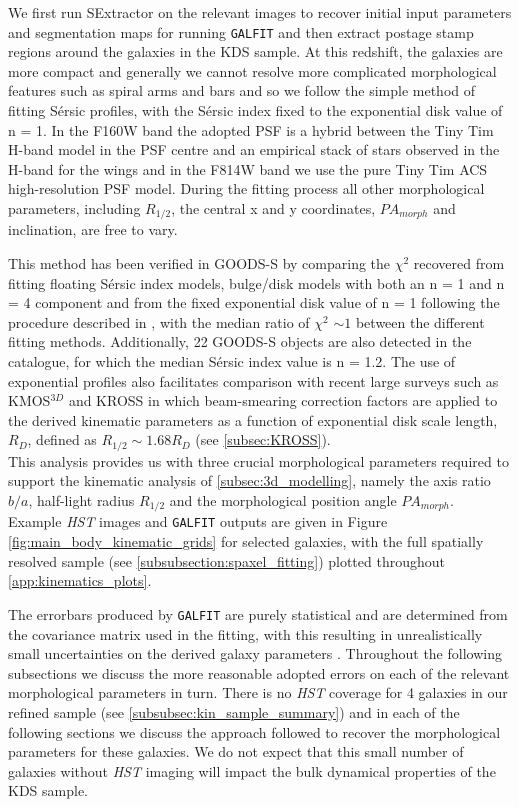 \documentclass[fleqn,usenatbib]{mn2e}
\newcommand{\Sers}{S\'{e}rsic }
\begin{document}
We first run SExtractor \citep{Bertin1996} on the relevant images to recover initial input parameters and segmentation maps for running {\tt GALFIT} and then extract postage stamp regions around the galaxies in the KDS sample.
At this redshift, the galaxies are more compact and generally we cannot resolve more complicated morphological features such as spiral arms and bars and so we follow the simple method of fitting \Sers profiles, with the \Sers index fixed to the exponential disk value of n = 1.
In the F160W band the adopted PSF is a hybrid between the Tiny Tim H-band model \citep{Krist2011} in the PSF centre and an empirical stack of stars observed in the H-band for the wings \citep{VanderWel2012} and in the F814W band we use the pure Tiny Tim ACS high-resolution PSF model.
During the fitting process all other morphological parameters, including $R_{1/2}$, the central x and y coordinates, $PA_{morph}$ and inclination, are free to vary.

This method has been verified in GOODS-S by comparing the $\chi ^{2}$ recovered from fitting floating \Sers index models, bulge/disk models with both an n = 1 and n = 4 component and from the fixed exponential disk value of n = 1 following the procedure described in \cite{Bruce2012}, with the median ratio of $\chi ^{2}$ $\sim 1$ between the different fitting methods. Additionally, 22 GOODS-S objects are also detected in the \cite{VanderWel2012} catalogue, for which the median \Sers index value is n = 1.2.
The use of exponential profiles also facilitates comparison with recent large surveys such as KMOS$^{3D}$ \citep{Wisnioski2015} and KROSS \citep{Harrison2017} in which beam-smearing correction factors are applied to the derived kinematic parameters as a function of exponential disk scale length, $R_{D}$, defined as $R_{1/2} \sim 1.68 R_{D}$ (see \cref{subsec:KROSS}). \\

This analysis provides us with three crucial morphological parameters required to support the kinematic analysis of \cref{subsec:3d_modelling}, namely the axis ratio $b/a$, half-light radius $R_{1/2}$ and the morphological position angle $PA_{morph}$.
Example {\em HST} images and {\tt GALFIT} outputs are given in Figure \ref{fig:main_body_kinematic_grids} for selected galaxies, with the full spatially resolved sample (see \cref{subsubsection:spaxel_fitting}) plotted throughout \cref{app:kinematics_plots}. 

The errorbars produced by {\tt GALFIT} are purely statistical and are determined from the covariance matrix used in the fitting, with this resulting in unrealistically small uncertainties on the derived galaxy parameters \citep{Hausler2007,Bruce2012}.
Throughout the following subsections we discuss the more reasonable adopted errors on each of the relevant morphological parameters in turn.
There is no {\em HST} coverage for 4 galaxies in our refined sample (see \cref{subsubsec:kin_sample_summary}) and in each of the following sections we discuss the approach followed to recover the morphological parameters for these galaxies.
We do not expect that this small number of galaxies without {\em HST} imaging will impact the bulk dynamical properties of the KDS sample.
\end{document}
